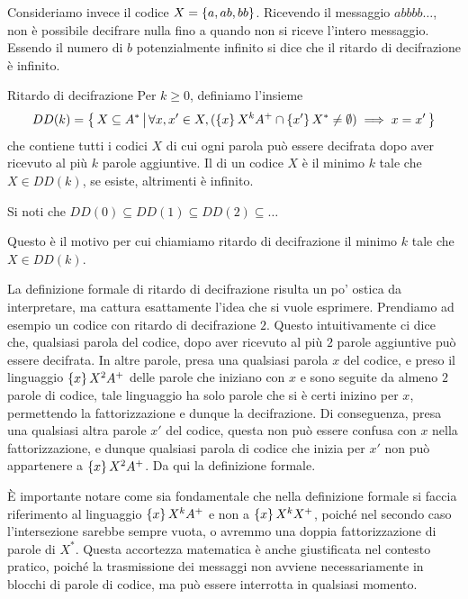Consideriamo invece il codice \(X = \set{a,ab,bb}\). Ricevendo il messaggio \(abbbb\ldots\), non è possibile
decifrare nulla fino a quando non si riceve l'intero messaggio.
Essendo il numero di \(b\) potenzialmente infinito si dice che il ritardo di decifrazione è infinito.

\begin{definition}{Ritardo di decifrazione}
  Per \(k\geq 0\), definiamo l'insieme
  \begin{equation*}
    DD(k) = \set{X\subseteq A^* }[\forall x,x' \in X, (\set{x}X^k A^+ \cap \set{x'}X^* \neq \emptyset) \implies x = x']
  \end{equation*}
  che contiene tutti i codici \(X\) di cui ogni parola può essere decifrata dopo aver ricevuto al più \(k\) parole aggiuntive.
  Il  di un codice \(X\) è il minimo \(k\) tale che \(X \in DD(k)\), se esiste, altrimenti è infinito.
\end{definition}

\begin{observation}
  Si noti che \(DD(0) \subseteq DD(1) \subseteq DD(2) \subseteq \ldots\)

  Questo è il motivo per cui chiamiamo ritardo di decifrazione il minimo \(k\) tale che \(X \in DD(k)\).
\end{observation}

La definizione formale di ritardo di decifrazione risulta un po' ostica da interpretare, ma cattura esattamente l'idea che si vuole esprimere.
Prendiamo ad esempio un codice con ritardo di decifrazione \(2\).
Questo intuitivamente ci dice che, qualsiasi parola del codice, dopo aver ricevuto al più \(2\) parole aggiuntive può essere decifrata.
In altre parole, presa una qualsiasi parola \(x\) del codice, e preso il linguaggio \(\set{x}X^2 A^+\) delle parole che iniziano con \(x\) e sono seguite da almeno \(2\) parole di codice,
tale linguaggio ha solo parole che si è certi inizino per \(x\), permettendo la fattorizzazione e dunque la decifrazione.
Di conseguenza, presa una qualsiasi altra parole \(x'\) del codice, questa non può essere confusa con \(x\) nella fattorizzazione, e dunque qualsiasi parola di codice che inizia per \(x'\) non può appartenere a \(\set{x}X^2 A^+\).
Da qui la definizione formale.

È importante notare come sia fondamentale che nella definizione formale si faccia riferimento al linguaggio \(\set{x}X^k A^+\) e non a \(\set{x}X^k X^+\), poiché nel secondo caso l'intersezione sarebbe sempre vuota, o avremmo una doppia fattorizzazione di parole di \(X^*\).
Questa accortezza matematica è anche giustificata nel contesto pratico, poiché la trasmissione dei messaggi non avviene necessariamente in blocchi di parole di codice, ma può essere interrotta in qualsiasi momento.

